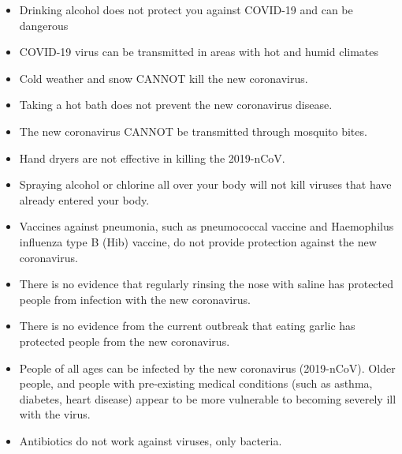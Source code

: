 \documentclass[10pt,a4paper]{article}
\begin{document}
\begin{multicols}{2}
\begin{itemize}
            \item Drinking alcohol does not protect you against COVID-19 and can be dangerous
            \item COVID-19 virus can be transmitted in areas with hot and humid climates
            \item Cold weather and snow CANNOT kill the new coronavirus.
            \item Taking a hot bath does not prevent the new coronavirus disease.
            \item The new coronavirus CANNOT be transmitted through mosquito bites.
            \item Hand dryers are not effective in killing the 2019-nCoV.
            \item Spraying alcohol or chlorine all over your body will not kill viruses that have already entered your body.
            \item Vaccines against pneumonia, such as pneumococcal vaccine and Haemophilus influenza type B (Hib) vaccine, do not provide protection against the new coronavirus.
            \item There is no evidence that regularly rinsing the nose with saline has protected people from infection with the new coronavirus. 
            \item There is no evidence from the current outbreak that eating garlic has protected people from the new coronavirus.
            \item People of all ages can be infected by the new coronavirus (2019-nCoV). Older people, and people with pre-existing medical conditions (such as asthma, diabetes, heart disease) appear to be more vulnerable to becoming severely ill with the virus. 
            \item  Antibiotics do not work against viruses, only bacteria.
        \end{itemize}
		

\end{multicols}
\end{document}
